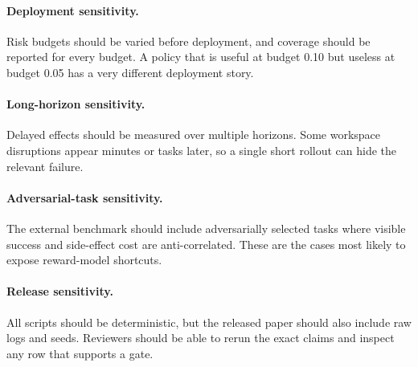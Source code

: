 \documentclass{article}
\begin{document}
\paragraph{Deployment sensitivity.}
Risk budgets should be varied before deployment, and coverage should be reported for every budget. A policy that is useful at budget 0.10 but useless at budget 0.05 has a very different deployment story.

\paragraph{Long-horizon sensitivity.}
Delayed effects should be measured over multiple horizons. Some workspace disruptions appear minutes or tasks later, so a single short rollout can hide the relevant failure.

\paragraph{Adversarial-task sensitivity.}
The external benchmark should include adversarially selected tasks where visible success and side-effect cost are anti-correlated. These are the cases most likely to expose reward-model shortcuts.

\paragraph{Release sensitivity.}
All scripts should be deterministic, but the released paper should also include raw logs and seeds. Reviewers should be able to rerun the exact claims and inspect any row that supports a gate.

\begingroup
\raggedright


\endgroup
\end{document}
